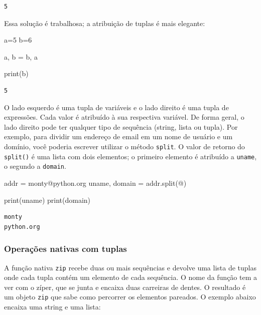 \documentclass[
  brazilian,
  letterpaper,
  DIV=11,
  numbers=noendperiod]{scrreprt}
\newenvironment{Shaded}{\begin{snugshade}}{\end{snugshade}}
\newcommand{\BuiltInTok}[1]{\textcolor[rgb]{0.00,0.23,0.31}{#1}}
\newcommand{\DecValTok}[1]{\textcolor[rgb]{0.68,0.00,0.00}{#1}}
\newcommand{\NormalTok}[1]{\textcolor[rgb]{0.00,0.23,0.31}{#1}}
\newcommand{\OperatorTok}[1]{\textcolor[rgb]{0.37,0.37,0.37}{#1}}
\newcommand{\StringTok}[1]{\textcolor[rgb]{0.13,0.47,0.30}{#1}}
\begin{document}
\begin{verbatim}
5
\end{verbatim}

Essa solução é trabalhosa; a atribuição de tuplas é mais elegante:

\begin{Shaded}
\begin{Highlighting}[]
\NormalTok{a}\OperatorTok{=}\DecValTok{5}
\NormalTok{b}\OperatorTok{=}\DecValTok{6}

\NormalTok{a, b }\OperatorTok{=}\NormalTok{ b, a}

\BuiltInTok{print}\NormalTok{(b)}
\end{Highlighting}
\end{Shaded}

\begin{verbatim}
5
\end{verbatim}

O lado esquerdo é uma tupla de variáveis e o lado direito é uma tupla de
expressões. Cada valor é atribuído à sua respectiva variável. De forma
geral, o lado direito pode ter qualquer tipo de sequência (string, lista
ou tupla). Por exemplo, para dividir um endereço de email em um nome de
usuário e um domínio, você poderia escrever utilizar o método
\texttt{split}. O valor de retorno do \texttt{split()} é uma lista com
dois elementos; o primeiro elemento é atribuído a \texttt{uname}, o
segundo a \texttt{domain}.

\begin{Shaded}
\begin{Highlighting}[]
\NormalTok{addr }\OperatorTok{=} \StringTok{\textquotesingle{}monty@python.org\textquotesingle{}}
\NormalTok{uname, domain }\OperatorTok{=}\NormalTok{ addr.split(}\StringTok{\textquotesingle{}@\textquotesingle{}}\NormalTok{)}

\BuiltInTok{print}\NormalTok{(uname)}
\BuiltInTok{print}\NormalTok{(domain)}
\end{Highlighting}
\end{Shaded}

\begin{verbatim}
monty
python.org
\end{verbatim}

\subsubsection{Operações nativas com
tuplas}\label{operauxe7uxf5es-nativas-com-tuplas}

A função nativa \texttt{zip} recebe duas ou mais sequências e devolve
uma lista de tuplas onde cada tupla contém um elemento de cada
sequência. O nome da função tem a ver com o zíper, que se junta e
encaixa duas carreiras de dentes. O resultado é um objeto \texttt{zip}
que sabe como percorrer os elementos pareados. O exemplo abaixo encaixa
uma string e uma lista:
\end{document}
